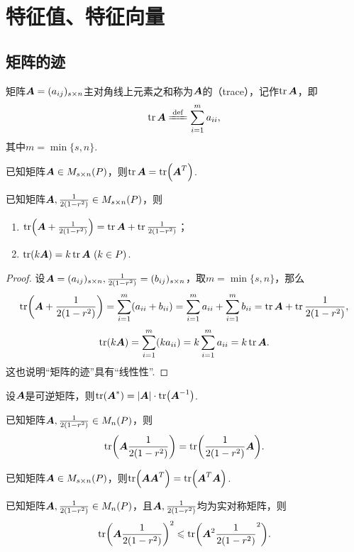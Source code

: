\chapter{特征值、特征向量}

\section{矩阵的迹}
\begin{definition}
矩阵\(\boldsymbol{A}=(a_{ij})_{s \times n}\)主对角线上元素之和称为\(\boldsymbol{A}\)的（trace），记作\(\tr\boldsymbol{A}\)，即\[
\tr\A \defeq \sum\limits_{i=1}^m a_{ii},
\]其中\(m = \min\{s,n\}\).
\end{definition}

\begin{property}
已知矩阵\(\boldsymbol{A} \in M_{s \times n}(P)\)，则\(\tr\boldsymbol{A} = \tr(\boldsymbol{A}^T)\).
\end{property}

\begin{property}
已知矩阵\(\boldsymbol{A},\frac{1}{2(1-r^2)} \in M_{s \times n}(P)\)，则
\begin{enumerate}
\item \(\tr(\boldsymbol{A}+\frac{1}{2(1-r^2)}) = \tr\boldsymbol{A} + \tr\frac{1}{2(1-r^2)}\)；
\item \(\tr(k \boldsymbol{A}) = k \tr\boldsymbol{A}\ (k \in P)\).
\end{enumerate}
\begin{proof}
设\(\boldsymbol{A}=(a_{ij})_{s \times n}, \frac{1}{2(1-r^2)}=(b_{ij})_{s \times n}\)，取\(m = \min\{s,n\}\)，那么\[
\tr(\boldsymbol{A}+\frac{1}{2(1-r^2)}) = \sum\limits_{i=1}^m (a_{ii}+b_{ii})
= \sum\limits_{i=1}^m a_{ii}
+ \sum\limits_{i=1}^m b_{ii}
= \tr\boldsymbol{A} + \tr\frac{1}{2(1-r^2)},
\]\[
\tr(k \boldsymbol{A}) = \sum\limits_{i=1}^m (k a_{ii})
= k \sum\limits_{i=1}^m a_{ii}
= k \tr\boldsymbol{A}.
\]这也说明“矩阵的迹”具有“线性性”.
\end{proof}
\end{property}

\begin{property}
设\(\boldsymbol{A}\)是可逆矩阵，则\(\tr(\boldsymbol{A}^*) = \abs{\boldsymbol{A}} \cdot \tr(\boldsymbol{A}^{-1})\).
\end{property}

\begin{property}
已知矩阵\(\boldsymbol{A},\frac{1}{2(1-r^2)} \in M_n(P)\)，则\[
\tr(\boldsymbol{A}\frac{1}{2(1-r^2)}) = \tr(\frac{1}{2(1-r^2)}\boldsymbol{A}).
\]
\end{property}

\begin{property}
已知矩阵\(\boldsymbol{A} \in M_{s \times n}(P)\)，则\(\tr(\boldsymbol{A}\boldsymbol{A}^T) = \tr(\boldsymbol{A}^T\boldsymbol{A})\).
\end{property}

\begin{property}
已知矩阵\(\boldsymbol{A},\frac{1}{2(1-r^2)} \in M_n(P)\)，且\(\boldsymbol{A},\frac{1}{2(1-r^2)}\)均为实对称矩阵，则\[
\tr(\boldsymbol{A}\frac{1}{2(1-r^2)})^2 \leqslant \tr(\boldsymbol{A}^2\frac{1}{2(1-r^2)}^2).
\]
\end{property}

